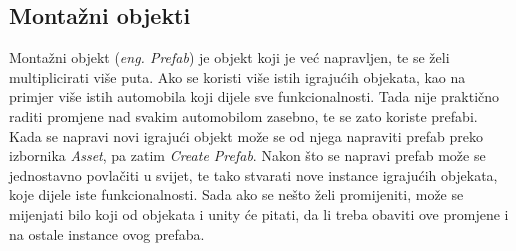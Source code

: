 \subsection{Montažni objekti}
Montažni objekt (\emph{eng. Prefab}) je objekt koji je već napravljen, te se želi multiplicirati više puta. Ako se koristi više istih igrajućih objekata, kao na primjer više istih automobila koji dijele sve funkcionalnosti. Tada nije praktično raditi promjene nad svakim automobilom zasebno, te se zato koriste prefabi. Kada se napravi novi igrajući objekt može se od njega napraviti prefab preko izbornika \emph{Asset}, pa zatim \emph{Create Prefab}. Nakon što se napravi prefab može se jednostavno povlačiti u svijet, te tako stvarati nove instance igrajućih objekata, koje dijele iste funkcionalnosti. Sada ako se nešto želi promijeniti, može se mijenjati bilo koji od objekata i unity će pitati, da li treba obaviti ove promjene i na ostale instance ovog prefaba.